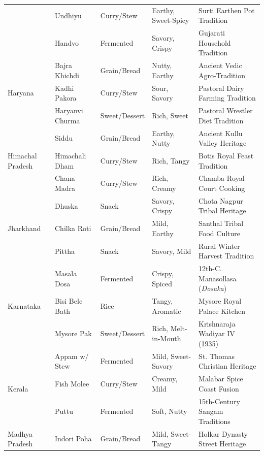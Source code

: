 \documentclass[11pt,a4paper]{report}
\begin{document}
\begin{small}
\begin{longtable}{llllp{4.2cm}}
        & Undhiyu & Curry/Stew & Earthy, Sweet-Spicy & Surti Earthen Pot Tradition \\
        & Handvo & Fermented & Savory, Crispy & Gujarati Household Tradition \\
    \midrule
    \multirow{3}{*}{Haryana}
        & Bajra Khichdi & Grain/Bread & Nutty, Earthy & Ancient Vedic Agro-Tradition \\
        & Kadhi Pakora & Curry/Stew & Sour, Savory & Pastoral Dairy Farming Tradition \\
        & Haryanvi Churma & Sweet/Dessert & Rich, Sweet & Pastoral Wrestler Diet Tradition \\
    \midrule
    \multirow{3}{*}{Himachal Pradesh}
        & Siddu & Grain/Bread & Earthy, Nutty & Ancient Kullu Valley Heritage \\
        & Himachali Dham & Curry/Stew & Rich, Tangy & Botis Royal Feast Tradition \\
        & Chana Madra & Curry/Stew & Rich, Creamy & Chamba Royal Court Cooking \\
    \midrule
    \multirow{3}{*}{Jharkhand}
        & Dhuska & Snack & Savory, Crispy & Chota Nagpur Tribal Heritage \\
        & Chilka Roti & Grain/Bread & Mild, Earthy & Santhal Tribal Food Culture \\
        & Pittha & Snack & Savory, Mild & Rural Winter Harvest Tradition \\
    \midrule
    \multirow{3}{*}{Karnataka}
        & Masala Dosa & Fermented & Crispy, Spiced & 12th-C. Manasollasa (\emph{Dosaka}) \\
        & Bisi Bele Bath & Rice & Tangy, Aromatic & Mysore Royal Palace Kitchen \\
        & Mysore Pak & Sweet/Dessert & Rich, Melt-in-Mouth & Krishnaraja Wadiyar IV (1935) \\
    \midrule
    \multirow{3}{*}{Kerala}
        & Appam w/ Stew & Fermented & Mild, Sweet-Savory & St. Thomas Christian Heritage \\
        & Fish Molee & Curry/Stew & Creamy, Mild & Malabar Spice Coast Fusion \\
        & Puttu & Fermented & Soft, Nutty & 15th-Century Sangam Traditions \\
    \midrule
    \multirow{3}{*}{Madhya Pradesh}
        & Indori Poha & Grain/Bread & Mild, Sweet-Tangy & Holkar Dynasty Street Heritage \\

\end{longtable}
\end{small}
\end{document}

